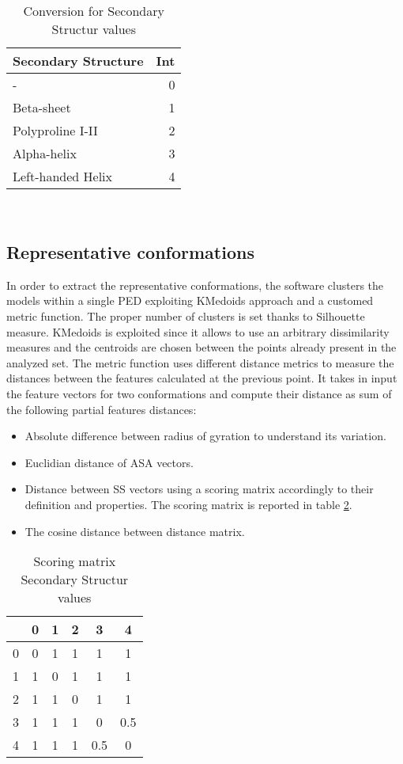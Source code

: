 \begin{table}[H]
\begin{center}
\begin{tabular}{lr}
Secondary Structure & Int \\
\hline
- & 0\\
\hline
Beta-sheet & 1\\
\hline
Polyproline I-II & 2\\
\hline
Alpha-helix & 3\\
\hline
Left-handed Helix & 4\\
\end{tabular}
\end{center}
\caption{Conversion for Secondary Structur values}~\label{tab:ss}
\end{table}



\subsection{Representative conformations} 
In order to extract the representative conformations, the software clusters the models within a single PED exploiting KMedoids approach and a customed metric function. The proper number of clusters is set thanks to Silhouette measure. 
KMedoids is exploited since it allows to use an arbitrary dissimilarity measures and the centroids are chosen between the points already present in the analyzed set. 
The metric function uses different distance metrics to measure the distances between the features calculated at the previous point. It takes in input the feature vectors for two conformations and compute their distance as sum of the following partial features distances:
\begin{itemize}
\item Absolute difference between radius of gyration to understand its variation.
\item Euclidian distance of ASA vectors.
\item Distance between SS vectors using a scoring matrix accordingly to their definition and properties. The scoring matrix is reported in table \ref{tab:score}. 
\item The cosine distance between distance matrix. 
\end{itemize}

\begin{table}[H]
\begin{center}
\begin{tabular}{c|ccccc}
& 0 & 1 & 2 & 3 & 4 \\
\hline
0 & 0 & 1 & 1 & 1 & 1\\
1 & 1 & 0 & 1 & 1 & 1\\
2 & 1 & 1 & 0 & 1 & 1\\
3 & 1 & 1 & 1 & 0 & 0.5\\
4 & 1 & 1 & 1 & 0.5 & 0\\
\end{tabular}
\end{center}
\caption{Scoring matrix Secondary Structur values}~\label{tab:score}
\end{table}


